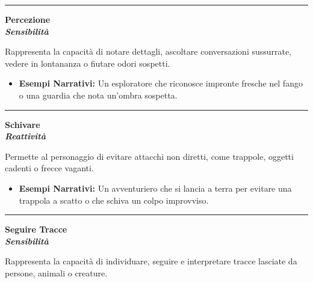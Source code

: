 \documentclass[../manuale_main.tex]{subfiles}
\begin{document}
\vspace{0.5cm}
\noindent
\begin{center}
\rule{\textwidth}{0.4pt} 
\end{center}
\vspace{0.5cm}

\begin{center}
\textbf{\large{Percezione}}\\ \textit{\textbf{Sensibilità}}\\
\end{center}
Rappresenta la capacità di notare dettagli, ascoltare conversazioni sussurrate, vedere in lontananza o fiutare odori sospetti.

\begin{itemize}
\item \textbf{Esempi Narrativi:} Un esploratore che riconosce impronte fresche nel fango o una guardia che nota un'ombra sospetta.
\end{itemize}


\vspace{0.5cm}
\noindent
\begin{center}
\rule{\textwidth}{0.4pt} 
\end{center}
\vspace{0.5cm}

\begin{center}
\textbf{\large{Schivare}}\\ \textit{\textbf{Reattività}}\\
\end{center}
Permette al personaggio di evitare attacchi non diretti, come trappole, oggetti cadenti o frecce vaganti.

\begin{itemize}
\item \textbf{Esempi Narrativi:} Un avventuriero che si lancia a terra per evitare una trappola a scatto o che schiva un colpo improvviso.
\end{itemize}


\vspace{0.5cm}
\noindent
\begin{center}
\rule{\textwidth}{0.4pt} 
\end{center}
\vspace{0.5cm}

\begin{center}
\textbf{\large{Seguire Tracce}}\\ \textit{\textbf{Sensibilità}}\\
\end{center}
Rappresenta la capacità di individuare, seguire e interpretare tracce lasciate da persone, animali o creature.
\end{document}
